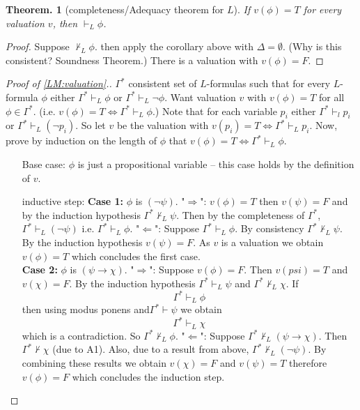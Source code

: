 \documentclass[a4paper,oneside,11pt,DIV=12,parskip=half]{scrartcl}
\theoremstyle{plain}
\newtheorem{theorem}{Theorem.}[section]
\theoremstyle{definition}
\newtheorem{remark, definition}[theorem]{Remark and Definition.}
\newtheorem{lemma, definition}[theorem]{Lemma and Definition.}
\newtheorem{theorem, definition}[theorem]{Theorem and Definition.}
\theoremstyle{remark}
\newtheorem*{remark, example}{\textbf{Remark and Exercise}}
\begin{document}
\begin{theorem}[completeness/Adequacy theorem for $L$]\label{Th:completenessL}
If $v(\phi) = T$ for every valuation $v$, then $\vdash_L \phi$.
\end{theorem}

\begin{proof}
 Suppose $\not \vdash_L \phi $. then apply the corollary above with $\Delta = \emptyset$. (Why is this consistent? Soundness Theorem.) There is a valuation with $v(\phi) = F$.
\end{proof}

\begin{proof}[Proof of \ref{LM:valuation}.]
 $\Gamma^*$ consistent set of $L$-formulas such that for every $L$-formula $\phi$ either $\Gamma^* \vdash_L \phi$ or $\Gamma^* \vdash_L \lnot \phi$. Want valuation $v$ with $v(\phi)= T$ for all $\phi \in \Gamma^*$. (i.e. $v(\phi) = T \Leftrightarrow \Gamma^* \vdash_L \phi$.)
 Note that for each variable $p_i$ either $\Gamma^* \vdash_l p_i$ or $\Gamma^* \vdash_L (\lnot p_i)$. So let $v$ be the valuation with $v(p_i) = T \Leftrightarrow \Gamma^* \vdash_L p_i$.
 Now, prove by induction on the length of $\phi$ that $v(\phi) = T \Leftrightarrow \Gamma^* \vdash_L \phi$.
 
 \begin{itemize}
     \item[Base case:] $\phi$ is just a propositional variable -- this case holds by the definition of $v$.
     \item[inductive step:]
     \textbf{Case 1:} $\phi$ is $(\lnot \psi)$.
     "$\Rightarrow$": $v(\phi) = T$ then $v(\psi) = F$ and by the induction hypothesis $\Gamma^* \not \vdash_L \psi$. Then by the completeness of $\Gamma^*$, $\Gamma^* \vdash_L (\lnot \psi)$ i.e. $\Gamma^* \vdash_L \phi$.
     "$\Leftarrow$": Suppose $\Gamma^* \vdash_L \phi$. By consistency $\Gamma^* \not \vdash_L \psi $. By the induction hypothesis $v(\psi) = F$. As $v$ is a valuation we obtain $v(\phi) = T$ which concludes the first case. \\
     \textbf{Case 2:} $\phi$ is $(\psi \rightarrow \chi)$.
     "$\Rightarrow$": Suppose $v(\phi) = F$. Then $v(psi) = T$ and $v(\chi) = F$. By the induction hypothesis $\Gamma^* \vdash_L \psi$ and $\Gamma^* \not \vdash_L \chi$. If
        \[ \Gamma^* \vdash_L \phi \] then using modus ponens and$\Gamma^* \vdash \psi$ we obtain 
        \[\Gamma^* \vdash_L \chi\] which is a contradiction. So $\Gamma^* \not \vdash_L \phi$.
    "$\Leftarrow$": Suppose $\Gamma^* \not \vdash_L (\psi \rightarrow \chi) $. Then $\Gamma^* \not \vdash \chi$ (due to A1).
    Also, due to a result from above, $\Gamma^* \not \vdash_L (\lnot \psi)$. By combining these results we obtain $v(\chi) = F$ and $v(\psi) = T$ therefore $v(\phi) = F$ which concludes the induction step.
 \end{itemize}
\end{proof}
\end{document}
